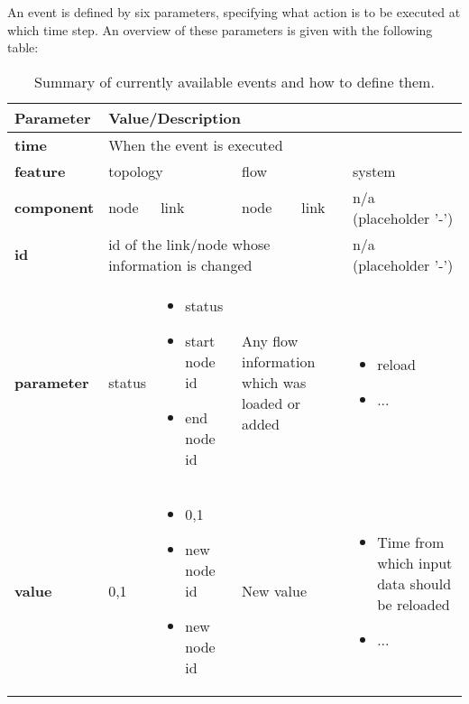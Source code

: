 \documentclass[11pt,fleqn]{book} %
\begin{document}
An event is defined by six parameters, specifying what action is to be executed at which time step. An overview of these parameters is given with the following table:
\begin{table}[h]
	\centering
	\begin{tabular}{|l| l|l|l | l| l|}
	\hline
	\rowcolor{Gray}
	Parameter & \multicolumn{5}{l|}{Value/Description}\\
	\hline
	\textbf{time} & \multicolumn{5}{l|}{When the event is executed} \\ \hline
	\textbf{feature} & \multicolumn{2}{l|}{topology} & \multicolumn{2}{l|}{flow} & system \\ \hline
	\textbf{component} & node & link & node & link & n/a (placeholder '-') \\ \hline
	\textbf{id} & \multicolumn{4}{l|}{id of the link/node whose information is changed} & n/a (placeholder '-') \\
	\hline
	\textbf{parameter} & status & \multicolumn{1}{p{2.5cm}|}{\begin{itemize}[leftmargin=*,label={-}]
			\item status
			\item start node id
			\item end node id
		\end{itemize}} & \multicolumn{2}{p{4.5cm}|}{Any flow information which was loaded or added} & \multicolumn{1}{p{2.5cm}|}{\begin{itemize}[leftmargin=*,label={-}]
		\item reload
		\item ...
	\end{itemize}}\\
	\hline
	\textbf{value} & 0,1 & \multicolumn{1}{p{2.5cm}|}{\begin{itemize}[leftmargin=*,label={-}]
			\item 0,1
			\item new node id
			\item new node id
		\end{itemize}} & \multicolumn{2}{p{4.5cm}|}{New value} & \multicolumn{1}{p{3cm}|}{\begin{itemize}[leftmargin=*,label={-}]
		\item Time from which input data should be reloaded
		\item ...
	\end{itemize}}\\
	\hline	
	\end{tabular}
	\caption{Summary of currently available events and how to define them.}
	\label{table:events}
\end{table}
\end{document}
